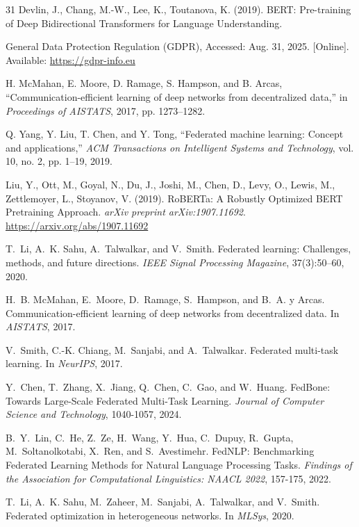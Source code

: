 \begin{thebibliography}{31}
			Devlin, J., Chang, M.-W., Lee, K., Toutanova, K. (2019). 
			BERT: Pre-training of Deep Bidirectional Transformers for Language Understanding. 

	General Data Protection Regulation (GDPR), Accessed: Aug. 31, 2025. [Online]. Available: \url{https://gdpr-info.eu}

	H. McMahan, E. Moore, D. Ramage, S. Hampson, and B. Arcas, ``Communication-efficient learning of deep networks from decentralized data,'' in \emph{Proceedings of AISTATS}, 2017, pp. 1273--1282.
	
	Q. Yang, Y. Liu, T. Chen, and Y. Tong, ``Federated machine learning: Concept and applications,'' \emph{ACM Transactions on Intelligent Systems and Technology}, vol. 10, no. 2, pp. 1--19, 2019.

			Liu, Y., Ott, M., Goyal, N., Du, J., Joshi, M., Chen, D., Levy, O., Lewis, M., Zettlemoyer, L., Stoyanov, V. (2019). 
			RoBERTa: A Robustly Optimized BERT Pretraining Approach. 
			\textit{arXiv preprint arXiv:1907.11692}. \url{https://arxiv.org/abs/1907.11692}
						
T.~Li, A.~K. Sahu, A.~Talwalkar, and V.~Smith.
Federated learning: Challenges, methods, and future directions.
\emph{IEEE Signal Processing Magazine}, 37(3):50--60, 2020.

H.~B. McMahan, E.~Moore, D.~Ramage, S.~Hampson, and B.~A. y Arcas.
Communication-efficient learning of deep networks from decentralized data.
In \emph{AISTATS}, 2017.

V.~Smith, C.-K. Chiang, M.~Sanjabi, and A.~Talwalkar.
Federated multi-task learning.
In \emph{NeurIPS}, 2017.

Y.~Chen, T.~Zhang, X.~Jiang, Q.~Chen, C.~Gao, and W.~Huang.
FedBone: Towards Large-Scale Federated Multi-Task Learning.
\emph{Journal of Computer Science and Technology}, 1040-1057, 2024.

B.~Y.~Lin, C.~He, Z.~Ze, H.~Wang, Y.~Hua, C.~Dupuy, R.~Gupta, M.~Soltanolkotabi, X.~Ren, and S.~Avestimehr.
FedNLP: Benchmarking Federated Learning Methods for Natural Language Processing Tasks.
\emph{Findings of the Association for Computational Linguistics: NAACL 2022}, 157-175, 2022.

T.~Li, A.~K. Sahu, M.~Zaheer, M.~Sanjabi, A.~Talwalkar, and V.~Smith.
Federated optimization in heterogeneous networks.
In \emph{MLSys}, 2020.


\end{thebibliography}
